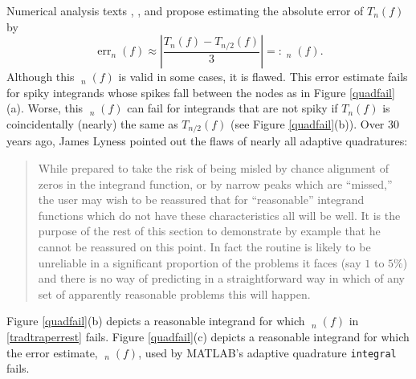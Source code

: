 \documentclass[11pt]{NSFamsart}
\DeclareMathOperator{\err}{err}
\DeclareMathOperator{\herr}{\widehat{\err}}
\def\abs#1{\ensuremath{\left \lvert #1 \right \rvert}}
\begin{document}
Numerical analysis texts  \cite[p.\ 223--224]{BurFai10}, \cite[p.\ 233]{CheKin12a}, 
and  \cite[p.\ 270]{Sau12a} propose estimating the absolute error of $T_n(f)$ by 
\begin{equation} \label{tradtraperrest}
 \err_n(f) \approx  \abs{\frac{T_n(f) - T_{n/2}(f)}{3}} =: \herr_n(f).
\end{equation}
Although this $\herr_n(f)$ is valid in some cases, it is flawed.  This error estimate fails for 
spiky integrands whose 
spikes fall  between the nodes as in Figure \ref{quadfail}(a).  Worse, this $\herr_n(f)$ can fail 
for 
integrands that are not spiky if $T_n(f)$ is coincidentally (nearly) 
the same as  $T_{n/2}(f)$ (see Figure \ref{quadfail}(b)).  Over 30 years ago, James 
Lyness \cite[p.\ 69]{Lyn83} pointed out the flaws of nearly all adaptive quadratures:
\begin{quote}
	While prepared to take the risk of being misled by chance alignment of zeros in the integrand 
	function, or by narrow peaks which are ``missed,'' the user may wish to be reassured that for 
	``reasonable'' integrand functions which do not have these characteristics all will be well. It is the 
	purpose of the rest of this section to demonstrate by example that he cannot be reassured on this 
	point. In fact the routine is likely to be unreliable in a significant proportion of the problems it faces 
	(say $1$ to $5\%$) and there is no way of predicting in a straightforward way in which of any set 
	of apparently reasonable problems this will happen.
\end{quote}
Figure \ref{quadfail}(b) depicts a reasonable integrand for which $\herr_n(f)$ in 
\eqref{tradtraperrest} fails.  Figure 
\ref{quadfail}(c) depicts a reasonable integrand for which the error estimate, $\herr_n(f)$, 
used 
by  
MATLAB's adaptive quadrature 
\texttt{integral} \cite{MAT9.3} fails.  
\end{document}
